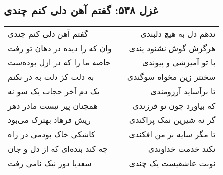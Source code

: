 \begin{center}
\section*{غزل ۵۳۸: گفتم آهن دلی کنم چندی}
\label{sec:538}
\begin{longtable}{l p{0.5cm} r}
گفتم آهن دلی کنم چندی
&&
ندهم دل به هیچ دلبندی
\\
وان که را دیده در دهان تو رفت
&&
هرگزش گوش نشنود پندی
\\
خاصه ما را که در ازل بوده‌ست
&&
با تو آمیزشی و پیوندی
\\
به دلت کز دلت به در نکنم
&&
سختتر زین مخواه سوگندی
\\
یک دم آخر حجاب یک سو نه
&&
تا برآساید آرزومندی
\\
همچنان پیر نیست مادر دهر
&&
که بیاورد چون تو فرزندی
\\
ریش فرهاد بهترک می‌بود
&&
گر نه شیرین نمک پراکندی
\\
کاشکی خاک بودمی در راه
&&
تا مگر سایه بر من افکندی
\\
چه کند بنده‌ای که از دل و جان
&&
نکند خدمت خداوندی
\\
سعدیا دور نیک نامی رفت
&&
نوبت عاشقیست یک چندی
\\
\end{longtable}
\end{center}
